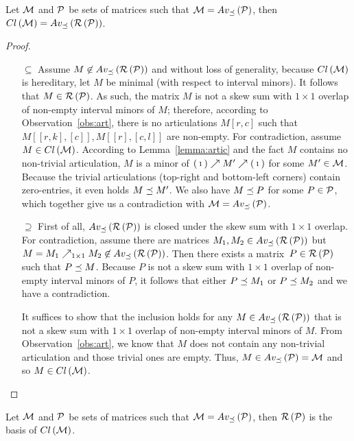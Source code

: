 \begin{thm}
\label{thm:basis}
Let $\mathcal{M}$ and $\mathcal{P}$ be sets of matrices such that $\mathcal{M}=Av_{\preceq}\left(\mathcal{P}\right)$, then $Cl\left(\mathcal{M}\right)=Av_{\preceq}\left(\mathcal{R}\left(\mathcal{P}\right)\right)$.
\end{thm}
\begin{proof}
\begin{itemize}
	\item[$\subseteq$] Assume $M\not\in Av_{\preceq}\left(\mathcal{R}\left(\mathcal{P}\right)\right)$ and without loss of generality, because $Cl\left(\mathcal{M}\right)$ is hereditary, let $M$ be minimal (with respect to interval minors). It follows that $M\in\mathcal{R}\left(\mathcal{P}\right)$. As such, the matrix $M$ is not a skew sum with $1\times1$ overlap of non-empty interval minors of $M$; therefore, according to Observation~\ref{obs:art}, there is no articulations $M[r,c]$ such that $M[[r,k],[c]],M[[r],[c,l]]$ are non-empty. For contradiction, assume $M\in Cl\left(\mathcal{M}\right)$. According to Lemma~\ref{lemma:artic} and the fact $M$ contains no non-trivial articulation, $M$ is a minor of $\left(\begin{smallmatrix}1\end{smallmatrix}\right)\nearrow M'\nearrow\left(\begin{smallmatrix}1\end{smallmatrix}\right)$ for some $M'\in\mathcal{M}$. Because the trivial articulations (top-right and bottom-left corners) contain zero-entries, it even holds $M\preceq M'$. We also have $M\preceq P$ for some $P\in\mathcal{P}$, which together give us a contradiction with $\mathcal{M}=Av_{\preceq}\left(\mathcal{P}\right)$.
	\item[$\supseteq$] First of all, $Av_{\preceq}\left(\mathcal{R}\left(\mathcal{P}\right)\right)$ is closed under the skew sum with $1\times1$ overlap. For contradiction, assume there are matrices $M_1,M_2\in Av_{\preceq}\left(\mathcal{R}\left(\mathcal{P}\right)\right)$ but $M=M_1\nearrow_{1\times1}M_2\not\in Av_{\preceq}\left(\mathcal{R}\left(\mathcal{P}\right)\right)$. Then there exists a matrix~$P\in\mathcal{R}\left(\mathcal{P}\right)$ such that $P\preceq M$. Because $P$ is not a skew sum with $1\times1$ overlap of non-empty interval minors of $P$, it follows that either $P\preceq M_1$ or $P\preceq M_2$ and we have a contradiction.

It suffices to show that the inclusion holds for any $M\in Av_{\preceq}\left(\mathcal{R}\left(\mathcal{P}\right)\right)$ that is not a skew sum with $1\times1$ overlap of non-empty interval minors of $M$. From Observation~\ref{obs:art}, we know that $M$ does not contain any non-trivial articulation and those trivial ones are empty. Thus, $M\in Av_{\preceq}\left(\mathcal{P}\right)=\mathcal{M}$ and so $M\in Cl\left(\mathcal{M}\right)$.
\end{itemize}
\end{proof}

\begin{cor}
Let $\mathcal{M}$ and $\mathcal{P}$ be sets of matrices such that $\mathcal{M}=Av_{\preceq}\left(\mathcal{P}\right)$, then $\mathcal{R}\left(\mathcal{P}\right)$ is the basis of $Cl\left(\mathcal{M}\right)$.
\end{cor}

